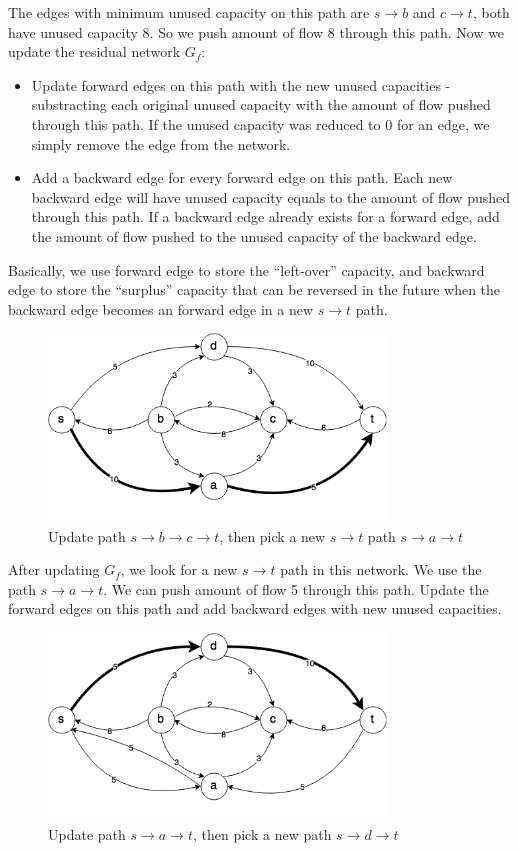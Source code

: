 \documentclass{article}
\begin{document}
The edges with minimum unused capacity on this path are $s \rightarrow b$
and $c \rightarrow t$, both have unused capacity 8. So we push amount of
flow 8 through this path.
Now we update the residual network $G_f$:
\begin{itemize}
\item Update forward edges on this path with the new unused capacities
- substracting each original unused capacity with the amount of flow 
pushed through this path. If the unused capacity was reduced to 0 for an edge,
we simply remove the edge from the network. 
\item Add a backward edge for every forward edge on this path.
Each new backward edge will have unused capacity equals to the amount of
flow pushed through this path. If a backward edge already exists for a
forward edge, add the amount of flow pushed to the unused capacity of the
backward edge.
\end{itemize} 
Basically, we use forward edge to store the ``left-over'' capacity,
and backward edge to store the ``surplus'' capacity that can be
reversed in the future when the backward edge becomes an forward edge in
a new $s \rightarrow t$ path.

\begin{figure}[H]
\centering
\includegraphics[width=0.8\textwidth]{gf_1.png}
\caption{Update path $s \rightarrow b \rightarrow c \rightarrow t$, then pick a new $s \rightarrow t$ path
$s \rightarrow a \rightarrow t$}
\end{figure}

After updating $G_f$, we look for a new $s \rightarrow t$ path in this 
network. We use the path $s \rightarrow a \rightarrow t$.
We can push amount of flow 5 through this path.
Update the forward edges on this path and add backward edges with
new unused capacities.

\begin{figure}[H]
\centering
\includegraphics[width=0.8\textwidth]{gf_2.png}
\caption{Update path $s \rightarrow a \rightarrow t$, then pick a new path
$s \rightarrow d \rightarrow t$}
\end{figure}
\end{document}
